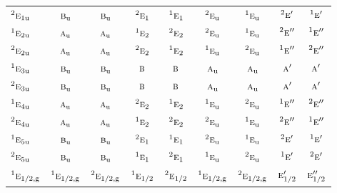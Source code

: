 \documentclass[10pt,a4paper]{article}
\numberwithin{equation}{section}
\newcommand{\irr}[1]{\text{\normalfont\scshape #1}}
\newcommand{\conjpair}[1]{{}^{#1}}
\newcommand{\ptag}[1]{\mathrm{#1}}
\begin{document}
{\begin{longtable}{@{}lcccccccc@{}}
$\conjpair{2}\irr{e}_{1\ptag{u}}$ & $\irr{b}_{\ptag{u}}$ & $\irr{b}_{\ptag{u}}$ & $\conjpair{2}\irr{e}_{1}$ & $\conjpair{1}\irr{e}_{1}$ & $\conjpair{2}\irr{e}_{\ptag{u}}$ & $\conjpair{1}\irr{e}_{\ptag{u}}$ & $\conjpair{2}\irr{e}'$ & $\conjpair{1}\irr{e}'$\\
$\conjpair{1}\irr{e}_{2\ptag{u}}$ & $\irr{a}_{\ptag{u}}$ & $\irr{a}_{\ptag{u}}$ & $\conjpair{1}\irr{e}_{2}$ & $\conjpair{2}\irr{e}_{2}$ & $\conjpair{2}\irr{e}_{\ptag{u}}$ & $\conjpair{1}\irr{e}_{\ptag{u}}$ & $\conjpair{2}\irr{e}''$ & $\conjpair{1}\irr{e}''$\\
$\conjpair{2}\irr{e}_{2\ptag{u}}$ & $\irr{a}_{\ptag{u}}$ & $\irr{a}_{\ptag{u}}$ & $\conjpair{2}\irr{e}_{2}$ & $\conjpair{1}\irr{e}_{2}$ & $\conjpair{1}\irr{e}_{\ptag{u}}$ & $\conjpair{2}\irr{e}_{\ptag{u}}$ & $\conjpair{1}\irr{e}''$ & $\conjpair{2}\irr{e}''$\\
$\conjpair{1}\irr{e}_{3\ptag{u}}$ & $\irr{b}_{\ptag{u}}$ & $\irr{b}_{\ptag{u}}$ & $\irr{b}$ & $\irr{b}$ & $\irr{a}_{\ptag{u}}$ & $\irr{a}_{\ptag{u}}$ & $\irr{a}'$ & $\irr{a}'$\\
$\conjpair{2}\irr{e}_{3\ptag{u}}$ & $\irr{b}_{\ptag{u}}$ & $\irr{b}_{\ptag{u}}$ & $\irr{b}$ & $\irr{b}$ & $\irr{a}_{\ptag{u}}$ & $\irr{a}_{\ptag{u}}$ & $\irr{a}'$ & $\irr{a}'$\\
$\conjpair{1}\irr{e}_{4\ptag{u}}$ & $\irr{a}_{\ptag{u}}$ & $\irr{a}_{\ptag{u}}$ & $\conjpair{2}\irr{e}_{2}$ & $\conjpair{1}\irr{e}_{2}$ & $\conjpair{1}\irr{e}_{\ptag{u}}$ & $\conjpair{2}\irr{e}_{\ptag{u}}$ & $\conjpair{1}\irr{e}''$ & $\conjpair{2}\irr{e}''$\\
$\conjpair{2}\irr{e}_{4\ptag{u}}$ & $\irr{a}_{\ptag{u}}$ & $\irr{a}_{\ptag{u}}$ & $\conjpair{1}\irr{e}_{2}$ & $\conjpair{2}\irr{e}_{2}$ & $\conjpair{2}\irr{e}_{\ptag{u}}$ & $\conjpair{1}\irr{e}_{\ptag{u}}$ & $\conjpair{2}\irr{e}''$ & $\conjpair{1}\irr{e}''$\\
$\conjpair{1}\irr{e}_{5\ptag{u}}$ & $\irr{b}_{\ptag{u}}$ & $\irr{b}_{\ptag{u}}$ & $\conjpair{2}\irr{e}_{1}$ & $\conjpair{1}\irr{e}_{1}$ & $\conjpair{2}\irr{e}_{\ptag{u}}$ & $\conjpair{1}\irr{e}_{\ptag{u}}$ & $\conjpair{2}\irr{e}'$ & $\conjpair{1}\irr{e}'$\\
$\conjpair{2}\irr{e}_{5\ptag{u}}$ & $\irr{b}_{\ptag{u}}$ & $\irr{b}_{\ptag{u}}$ & $\conjpair{1}\irr{e}_{1}$ & $\conjpair{2}\irr{e}_{1}$ & $\conjpair{1}\irr{e}_{\ptag{u}}$ & $\conjpair{2}\irr{e}_{\ptag{u}}$ & $\conjpair{1}\irr{e}'$ & $\conjpair{2}\irr{e}'$\\
$\conjpair{1}\irr{e}_{1/2,\ptag{g}}$ & $\conjpair{1}\irr{e}_{1/2,\ptag{g}}$ & $\conjpair{2}\irr{e}_{1/2,\ptag{g}}$ & $\conjpair{1}\irr{e}_{1/2}$ & $\conjpair{2}\irr{e}_{1/2}$ & $\conjpair{1}\irr{e}_{1/2,\ptag{g}}$ & $\conjpair{2}\irr{e}_{1/2,\ptag{g}}$ & $\irr{e}_{1/2}'$ & $\irr{e}_{1/2}''$\\

\end{longtable}}
\end{document}
